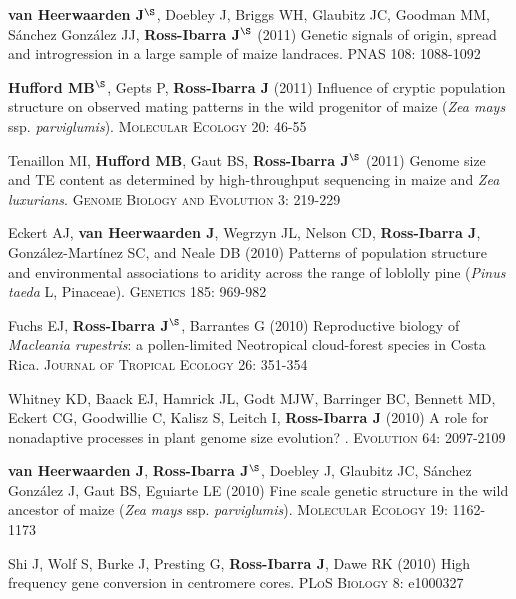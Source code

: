 \documentclass[letterpaper,10pt]{article}
\begin{document}
\begin{etaremune}
\item {\bf van Heerwaarden J}$^\S$, Doebley J, Briggs WH, Glaubitz JC, Goodman MM, S\'{a}nchez Gonz\'{a}lez JJ, {\bf Ross-Ibarra J}$^\S$ (2011) Genetic signals of origin, spread and introgression in a large sample of maize landraces. PNAS 108: 1088-1092


\item {\bf Hufford MB}$^\S$, Gepts P, {\bf Ross-Ibarra J} (2011) Influence of cryptic population structure on observed mating patterns in the wild progenitor of maize (\emph{Zea mays} ssp. \emph{parviglumis}).  \textsc{Molecular Ecology} 20: 46-55


\item Tenaillon MI, {\bf Hufford MB}, Gaut BS, {\bf Ross-Ibarra J}$^\S$ (2011)  Genome size and TE content as determined by high-throughput sequencing in maize and \emph{Zea luxurians}.  \textsc{Genome Biology and Evolution } 3: 219-229


\item Eckert AJ, {\bf van Heerwaarden J}, Wegrzyn JL, Nelson CD, {\bf Ross-Ibarra J}, Gonz\'{a}lez-Mart\'{i}nez SC, and Neale DB (2010) Patterns of population structure and environmental associations to aridity across the range of loblolly pine (\emph{Pinus taeda} L, Pinaceae).  \textsc{Genetics} 185: 969-982


\item Fuchs EJ, {\bf Ross-Ibarra J}$^\S$, Barrantes G (2010) Reproductive biology of \emph{Macleania rupestris}: a pollen-limited Neotropical cloud-forest species in Costa Rica.  \textsc{Journal of Tropical Ecology} 26: 351-354


\item Whitney KD, Baack EJ, Hamrick JL, Godt MJW, Barringer BC, Bennett MD, Eckert CG, Goodwillie C, Kalisz S, Leitch I, {\bf Ross-Ibarra J} (2010) A role for nonadaptive processes in plant genome size evolution? . \textsc{Evolution} 64: 2097-2109


\item {\bf van Heerwaarden J}, {\bf Ross-Ibarra J}$^\S$, Doebley J, Glaubitz JC, S\'{a}nchez Gonz\'{a}lez J, Gaut BS, Eguiarte LE (2010) Fine scale genetic structure in the wild ancestor of maize (\emph{Zea mays} ssp. \emph{parviglumis}).  \textsc{Molecular Ecology} 19: 1162-1173


\item Shi J, Wolf S, Burke J, Presting G, {\bf Ross-Ibarra J}, Dawe RK (2010) High frequency gene conversion in centromere cores.  \textsc{PLoS Biology} 8: e1000327



\end{etaremune}
\end{document}
